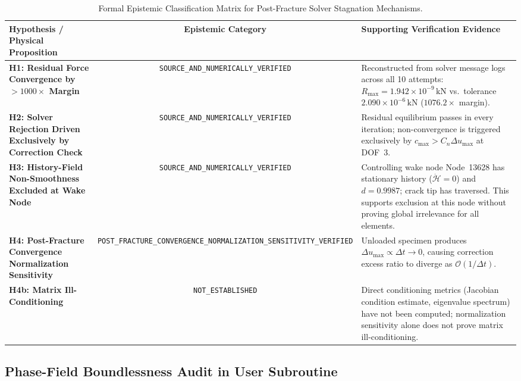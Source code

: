 \begin{table}[htbp]
\centering
\small
\caption{Formal Epistemic Classification Matrix for Post-Fracture Solver Stagnation Mechanisms.}
\label{tab:stage14uah_epistemic_classification}
\begin{tabularx}{\textwidth}{p{} c p{}}
\toprule
\textbf{Hypothesis / Physical Proposition} & \textbf{Epistemic Category} & \textbf{Supporting Verification Evidence} \\
\midrule
\textbf{H1: Residual Force Convergence by $>1000\times$ Margin} & \texttt{SOURCE\_AND\_NUMERICALLY\_VERIFIED} & Reconstructed from solver message logs across all 10 attempts: $R_{\max} = 1.942\times 10^{-9}\,\mathrm{kN}$ vs.\ tolerance $2.090\times 10^{-6}\,\mathrm{kN}$ ($1076.2\times$ margin). \\
\midrule
\textbf{H2: Solver Rejection Driven Exclusively by Correction Check} & \texttt{SOURCE\_AND\_NUMERICALLY\_VERIFIED} & Residual equilibrium passes in every iteration; non-convergence is triggered exclusively by $c_{\max} > C_n \Delta u_{\max}$ at DOF~3. \\
\midrule
\textbf{H3: History-Field Non-Smoothness Excluded at Wake Node} & \texttt{SOURCE\_AND\_NUMERICALLY\_VERIFIED} & Controlling wake node Node~13628 has stationary history ($\dot{\mathcal{H}} = 0$) and $d = 0.9987$; crack tip has traversed. This supports exclusion at this node without proving global irrelevance for all elements. \\
\midrule
\textbf{H4: Post-Fracture Convergence Normalization Sensitivity} & \texttt{POST\_FRACTURE\_CONVERGENCE\_NORMALIZATION\_SENSITIVITY\_VERIFIED} & Unloaded specimen produces $\Delta u_{\max} \propto \Delta t \to 0$, causing correction excess ratio to diverge as $\mathcal{O}(1/\Delta t)$. \\
\midrule
\textbf{H4b: Matrix Ill-Conditioning} & \texttt{NOT\_ESTABLISHED} & Direct conditioning metrics (Jacobian condition estimate, eigenvalue spectrum) have not been computed; normalization sensitivity alone does not prove matrix ill-conditioning. \\
\bottomrule
\end{tabularx}
\end{table}

\subsection{Phase-Field Boundlessness Audit in User Subroutine}
\label{subsec:stage14uah_fortran_audit}

